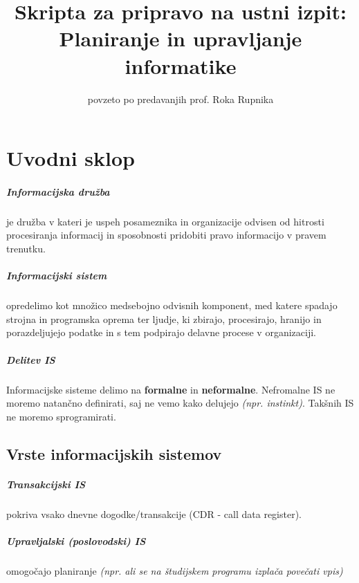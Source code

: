 \documentclass[a4paper,12pt]{report}
\begin{document}
\title{Skripta za pripravo na ustni izpit:\\Planiranje in upravljanje informatike}
\author{povzeto po predavanjih prof. Roka Rupnika}

\maketitle

\chapter{Uvodni sklop}

\paragraph{Informacijska družba} je družba v kateri je uspeh posameznika in organizacije odvisen od hitrosti procesiranja informacij in sposobnosti pridobiti pravo informacijo v pravem trenutku.

\paragraph{Informacijski sistem} opredelimo kot množico medsebojno odvisnih komponent,
   med katere spadajo strojna in programska oprema ter ljudje, ki zbirajo, procesirajo,
   hranijo in porazdeljujejo podatke in s tem podpirajo delavne procese v organizaciji.
      

\paragraph{Delitev IS} Informacijske sisteme delimo na \textbf{formalne} in \textbf{neformalne}. 
Nefromalne IS ne moremo natančno definirati, saj ne vemo kako delujejo \textit{(npr. instinkt)}. Takšnih IS ne moremo sprogramirati.

\section{Vrste informacijskih sistemov}

   \paragraph{Transakcijski IS} pokriva vsako dnevne dogodke/transakcije (CDR - call data register).

   \paragraph{Upravljalski (poslovodski) IS} omogočajo planiranje \textit{(npr. ali se na študijskem programu izplača povečati vpis)}
\end{document}
